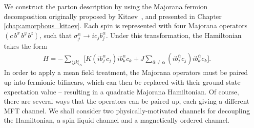 We construct the parton description by using the Majorana fermion decomposition originally proposed by Kitaev~\cite{kitaev_anyons_2006}, and presented in Chapter \ref{chap:amorphous_kitaev}. Each spin is represented with four Majorana operators $(c\, b^x\, b^y\, b^z)$, such that $\sigma_j^\alpha \rightarrow i c_j b_j^\alpha$. Under this transformation, the Hamiltonian takes the form
\begin{align} \label{eqn:maj_hamiltonian}
    H = - \sum_{\langle jk \rangle_\alpha}
    \bigg [  
    K (i b^\alpha_j   c_j)  i b^\alpha_k c_k  
    + J \sum_{\bar \alpha \neq \alpha} 
    (i b^{\bar \alpha}_j   c_j )  ib^{\bar \alpha}_k c_k 
    \bigg ].
\end{align}
In order to apply a mean field treatment, the Majorana operators must be paired up into fermionic bilinears, which can then be replaced with their ground state expectation value -- resulting in a quadratic Majorana Hamiltonian. Of course, there are several ways that the operators can be paired up, each giving a different MFT channel. We shall consider two physically-motivated channels for decoupling the Hamiltonian, a spin liquid channel and a magnetically ordered channel.

